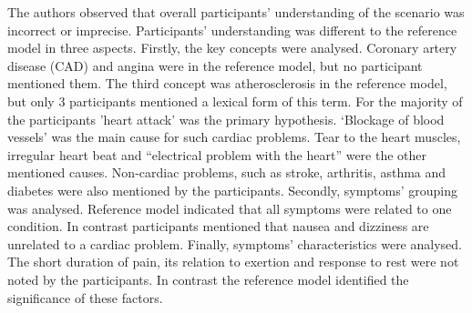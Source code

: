 \documentclass[]{article}
\begin{document}
The authors observed that overall participants’ understanding of the scenario was incorrect or imprecise. Participants' understanding was different to the reference model in three aspects. Firstly, the key concepts were analysed. Coronary artery disease (CAD) and angina were in the reference model, but no participant mentioned them. The third concept was atherosclerosis in the reference model, but only 3 participants mentioned a lexical form of this term. For the majority of the participants 'heart attack' was the primary hypothesis. ‘Blockage of blood vessels’ was the main cause for such cardiac problems. Tear to the heart muscles, irregular heart beat and “electrical problem with the heart” were the other mentioned causes. Non-cardiac problems, such as stroke, arthritis, asthma and diabetes were also mentioned by the participants. Secondly, symptoms’ grouping was analysed. Reference model indicated that all symptoms were related to one condition. In contrast participants mentioned that nausea and dizziness are unrelated to a cardiac problem. Finally, symptoms’ characteristics were analysed. The short duration of pain, its relation to exertion and response to rest were not noted by the participants. In contrast the reference model identified the significance of these factors. 
\end{document}
